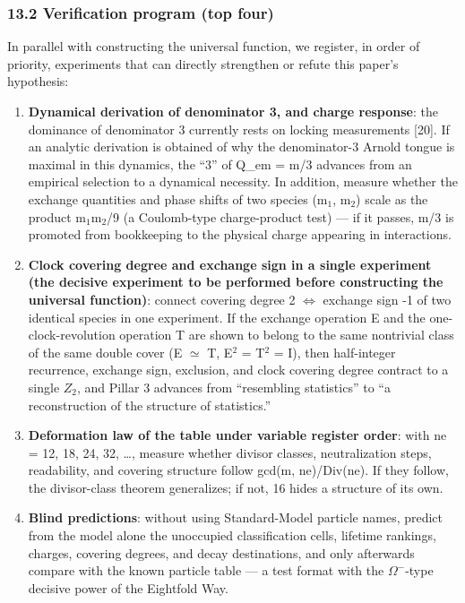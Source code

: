 \documentclass[
]{article}
\providecommand{\tightlist}{%
  \setlength{\itemsep}{0pt}\setlength{\parskip}{0pt}}
\begin{document}
\subsubsection{13.2 Verification program (top
four)}\label{verification-program-top-four}

In parallel with constructing the universal function, we register, in
order of priority, experiments that can directly strengthen or refute
this paper's hypothesis:

\begin{enumerate}
\def\labelenumi{\arabic{enumi}.}
\tightlist
\item
  \textbf{Dynamical derivation of denominator 3, and charge response}:
  the dominance of denominator 3 currently rests on locking measurements
  {[}20{]}. If an analytic derivation is obtained of why the
  denominator-3 Arnold tongue is maximal in this dynamics, the ``3'' of
  Q\_em = m/3 advances from an empirical selection to a dynamical
  necessity. In addition, measure whether the exchange quantities and
  phase shifts of two species (m\(_1\), m\(_2\)) scale as the product
  m\(_1\)m\(_2\)/9 (a Coulomb-type charge-product test) --- if it
  passes, m/3 is promoted from bookkeeping to the physical charge
  appearing in interactions.
\item
  \textbf{Clock covering degree and exchange sign in a single experiment
  (the decisive experiment to be performed before constructing the
  universal function)}: connect covering degree 2
  \(\Longleftrightarrow\) exchange sign -1 of two identical species in
  one experiment. If the exchange operation E and the
  one-clock-revolution operation T are shown to belong to the same
  nontrivial class of the same double cover (E \(\simeq\) T, E\(^2\) =
  T\(^2\) = I), then half-integer recurrence, exchange sign, exclusion,
  and clock covering degree contract to a single \(Z_2\), and Pillar 3
  advances from ``resembling statistics'' to ``a reconstruction of the
  structure of statistics.''
\item
  \textbf{Deformation law of the table under variable register order}:
  with ne = 12, 18, 24, 32, \ldots, measure whether divisor classes,
  neutralization steps, readability, and covering structure follow
  gcd(m, ne)/Div(ne). If they follow, the divisor-class theorem
  generalizes; if not, 16 hides a structure of its own.
\item
  \textbf{Blind predictions}: without using Standard-Model particle
  names, predict from the model alone the unoccupied classification
  cells, lifetime rankings, charges, covering degrees, and decay
  destinations, and only afterwards compare with the known particle
  table --- a test format with the \(\Omega^-\)-type decisive power of
  the Eightfold Way.
\end{enumerate}
\end{document}
